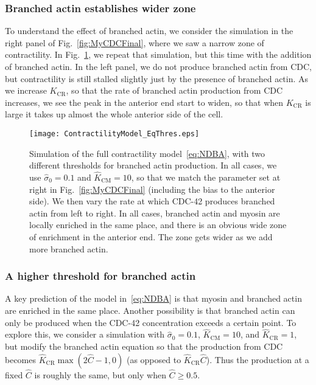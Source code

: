 \documentclass[11pt]{article}
\newcommand{\6}[1]{#1_{\text{6}}}
\newcommand{\3}[1]{#1_{\text{3}}}
\begin{document}
\subsubsection{Branched actin establishes wider zone}
To understand the effect of branched actin, we consider the simulation in the right panel of Fig.\ \ref{fig:MyCDCFinal}, where we saw a narrow zone of contractility. In Fig.\ \ref{fig:AllVarSS}, we repeat that simulation, but this time with the addition of branched actin. In the left panel, we do not produce branched actin from CDC, but contractility is still stalled slightly just by the presence of branched actin. As we increase $K_\text{CR}$, so that the rate of branched actin production from CDC increases, we see the peak in the anterior end start to widen, so that when $K_\text{CR}$ is large it takes up almost the whole anterior side of the cell. 

\begin{figure}
\centering
\texttt{[image: ContractilityModel\_EqThres.eps]}
\caption{\label{fig:AllVarSS}Simulation of the full contractility model\ \eqref{eq:NDBA}, with two different thresholds for branched actin production. In all cases, we use $\hat{\sigma}_0=0.1$ and $\hat K_\text{CM}=10$, so that we match the parameter set at right in Fig.\ \ref{fig:MyCDCFinal} (including the bias to the anterior side). We then vary the rate at which CDC-42 produces branched actin from left to right. In all cases, branched actin and myosin are locally enriched in the same place, and there is an obvious wide zone of enrichment in the anterior end. The zone gets wider as we add more branched actin.}
\end{figure}

\subsubsection{A higher threshold for branched actin}
A key prediction of the model in\ \eqref{eq:NDBA} is that myosin and branched actin are enriched in the same place. Another possibility is that branched actin can only be produced when the CDC-42 concentration exceeds a certain point. To explore this, we consider a simulation with $\hat{\sigma}_0=0.1$, $\hat K_\text{CM}=10$, and $\hat K_\text{CR}=1$, but modify the branched actin equation so that the production from CDC becomes $\hat{K}_\text{CR}\max{\left(2\hat C-1,0\right)}$ (as opposed to $\hat{K}_\text{CR}\hat C$). Thus the production at a fixed $\hat{C}$ is roughly the same, but only when $\hat{C} \geq 0.5$.
\end{document}
